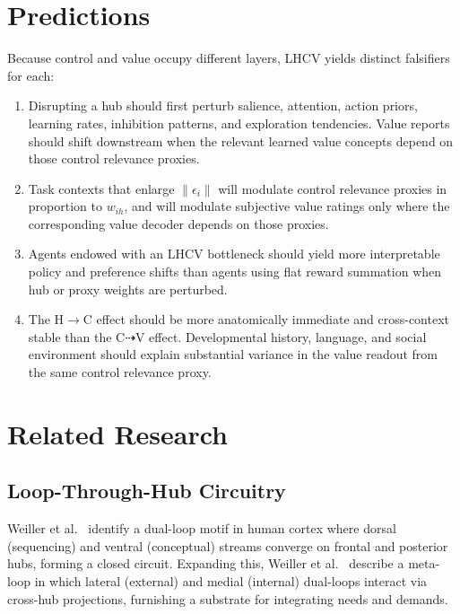 \documentclass[11pt]{article}
\begin{document}
\section{Predictions}

Because control and value occupy different layers, LHCV yields distinct falsifiers for each:

\begin{enumerate}[leftmargin=*]
  \item Disrupting a hub should first perturb salience, attention, action priors, learning rates, inhibition patterns, and exploration tendencies. Value reports should shift downstream when the relevant learned value concepts depend on those control relevance proxies.
  \item Task contexts that enlarge $\lVert\epsilon_i\rVert$ will modulate control relevance proxies in proportion to $w_{ih}$, and will modulate subjective value ratings only where the corresponding value decoder depends on those proxies.
  \item Agents endowed with an LHCV bottleneck should yield more interpretable policy and preference shifts than agents using flat reward summation when hub or proxy weights are perturbed.
  \item The H$\to$C effect should be more anatomically immediate and cross-context stable than the C$\dashrightarrow$V effect. Developmental history, language, and social environment should explain substantial variance in the value readout from the same control relevance proxy.
\end{enumerate}

\section{Related Research}

\subsection{Loop-Through-Hub Circuitry}

Weiller et al.\ \citep{weiller2022} identify a dual-loop motif in human cortex where dorsal (sequencing) and ventral (conceptual) streams converge on frontal and posterior hubs, forming a closed circuit. Expanding this, Weiller et al.\ \citep{weiller2025} describe a meta-loop in which lateral (external) and medial (internal) dual-loops interact via cross-hub projections, furnishing a substrate for integrating needs and demands.
\end{document}
